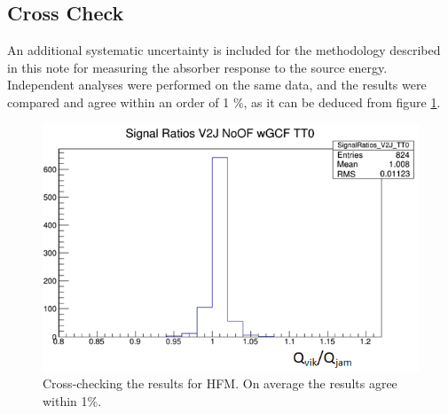 \subsection{Cross Check}
An additional systematic uncertainty is included for the
methodology described in this note for measuring the absorber response to the source energy. Independent analyses were performed on the same data, and the results were compared and agree within an order of 1 \%, as it can be deduced from figure \ref{fig:Crosscheck}.
\begin{figure}[htb]
    \begin{center}
        \includegraphics[width=.5\textwidth]{figures/ch_hfcalibration/Crosscheck.png}
        \caption{Cross-checking the results for HFM. On average the results agree
        within 1\%.}
        \label{fig:Crosscheck}
    \end{center}
\end{figure}